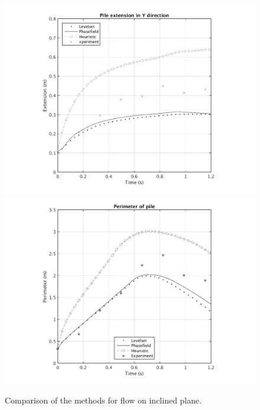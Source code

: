 \documentclass[letterpaper,10pt]{article}
\begin{document}
\begin{figure}[H]
\begin{minipage}[b]{.5\linewidth}
                  \label{area}
        \end{minipage}
        \begin{minipage}[b]{.5 \linewidth}
                \centering
                \includegraphics[scale=0.45]{IMAGES/yextend.png}
                  \label{y_extent}
                \includegraphics[scale=0.45]{IMAGES/perimeter.png}
                  \label{Perimeter}
        \end{minipage}
        \caption{Comparison of the methods for flow on inclined plane.}
        \label{compinc_inclined}
\end{figure}
\end{document}
